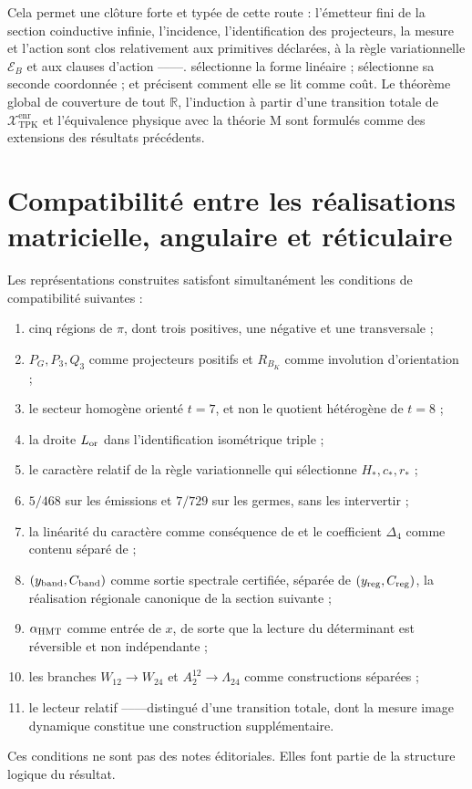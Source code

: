 Cela permet une clôture forte et typée de cette route : l’émetteur fini de la
section coinductive infinie, l’incidence, l’identification des
projecteurs, la mesure et l’action sont clos
relativement aux primitives déclarées, à la règle variationnelle
\(\mathcal E_B\) et aux clauses d’action \HTr--\HAdd--\HDef--\HRes--\HLoc. \HAdd
sélectionne la forme linéaire ; \HDef sélectionne sa seconde coordonnée ; \HRes et \HLoc
précisent comment elle se lit comme coût. Le théorème global de
couverture de tout \(\mathbb R\), l’induction à partir d’une transition totale de
\(\mathcal X_{\mathrm{TPK}}^{\mathrm{enr}}\) et l’équivalence physique avec
la théorie M sont formulés comme des extensions des résultats précédents.

\section{Compatibilité entre les réalisations matricielle, angulaire et réticulaire}

Les représentations construites satisfont simultanément les conditions
de compatibilité suivantes :
\begin{enumerate}
  \item cinq régions de \(\pi\), dont trois positives, une négative et une
  transversale ;
  \item \(P_G,P_3,Q_3\) comme projecteurs positifs et \(R_{B_K}\) comme
  involution d’orientation ;
  \item le secteur homogène orienté \(t=7\), et non le quotient hétérogène de \(t=8\) ;
  \item la droite \(L_{\rm or}\) dans l’identification isométrique triple ;
  \item le caractère relatif de la règle variationnelle qui sélectionne
  \(H_*,c_*,r_*\) ;
  \item \(5/468\) sur les émissions et \(7/729\) sur les germes, sans
  les intervertir ;
  \item la linéarité du caractère comme conséquence de \HAdd et le coefficient
  \(\Delta_4\) comme contenu séparé de \HDef ;
  \item \((y_{\rm band},C_{\rm band})\) comme sortie spectrale certifiée,
  séparée de \((y_{\rm reg},C_{\rm reg})\), la réalisation régionale
  canonique de la section suivante ;
  \item \(\alpha_{\rm HMT}\) comme entrée de \(x\), de sorte que la lecture
  du déterminant est réversible et non indépendante ;
  \item les branches \(W_{12}\to W_{24}\) et
  \(A_2^{12}\to\Lambda_{24}\) comme constructions séparées ;
  \item le lecteur relatif \HTr--\HAdd--\HDef--\HRes--\HLoc distingué d’une
  transition totale, dont la mesure image dynamique constitue une
  construction supplémentaire.
\end{enumerate}

Ces conditions ne sont pas des notes éditoriales. Elles font partie de la structure
logique du résultat.
